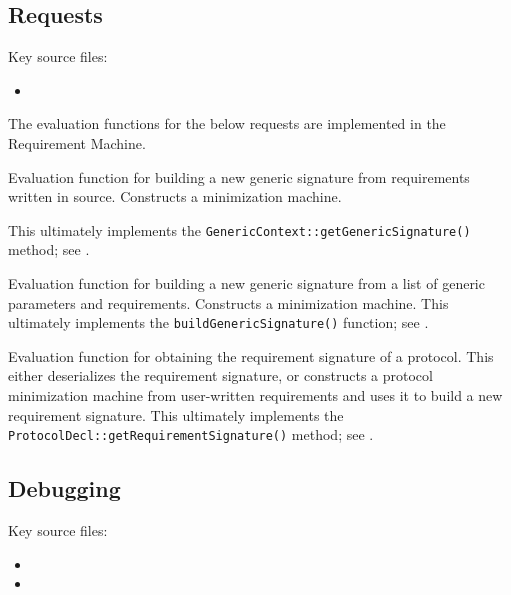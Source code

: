 \documentclass[../generics]{subfiles}
\begin{document}
\subsection*{Requests}

Key source files:
\begin{itemize}
\item {}
\end{itemize}

The evaluation functions for the below requests are implemented in the Requirement Machine.

Evaluation function for building a new generic signature from requirements written in source. Constructs a minimization machine.

This ultimately implements the \texttt{GenericContext::getGenericSignature()} method; see .

Evaluation function for building a new generic signature from a list of generic parameters and requirements. Constructs a minimization machine. This ultimately implements the \texttt{buildGenericSignature()} function; see .

Evaluation function for obtaining the requirement signature of a protocol. This either deserializes the requirement signature, or constructs a protocol minimization machine from user-written requirements and uses it to build a new requirement signature.
This ultimately implements the \texttt{ProtocolDecl::getRequirementSignature()} method; see .

\subsection*{Debugging}

Key source files:
\begin{itemize}
\item {}
\item {}
\end{itemize}
\end{document}
